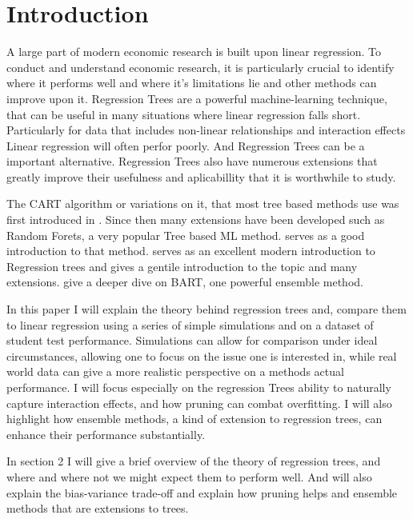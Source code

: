 \documentclass[12pt]{article}
\begin{document}



\tableofcontents


\section{Introduction}

A large part of modern economic research is built upon linear regression. To conduct and understand economic research, it is particularly crucial to identify where it performs well and where it's limitations lie and other methods can improve upon it. Regression Trees are a powerful machine-learning technique, that can be useful in many situations where linear regression falls short. Particularly for data that includes non-linear relationships and interaction effects Linear regression will often perfor poorly. And Regression Trees can be a important alternative. Regression Trees also have numerous extensions that greatly improve their usefulness and aplicabillity that it is worthwhile to study.


The CART algorithm or variations on it, that most tree based methods use was first introduced in \citep{breiman1984}. Since then many extensions have been developed such as Random Forets, a very popular Tree based ML method. \citep{biau2016} serves as a good introduction to that method. \citep{hastie2021} serves as an excellent modern introduction to Regression trees and gives a gentile introduction to the topic and many extensions. \citep{tan2019} give a deeper dive on BART, one powerful ensemble method.


In this paper I will explain the theory behind regression trees and, compare them to linear regression using a series of simple simulations and on a dataset of student test performance. Simulations can allow for comparison under ideal circumstances, allowing one to focus on the issue one is interested in, while real world data can give a more realistic perspective on a methods actual performance. I will focus especially on the regression Trees ability to naturally capture interaction effects, and how pruning can combat overfitting. I will also highlight how ensemble methods, a kind of extension to regression trees, can enhance their performance substantially.


In section 2 I will give a brief overview of the theory of regression trees, and where and where not we might expect them to perform well. And will also explain the bias-variance trade-off and explain how pruning helps and ensemble methods that are extensions to trees.
\end{document}
